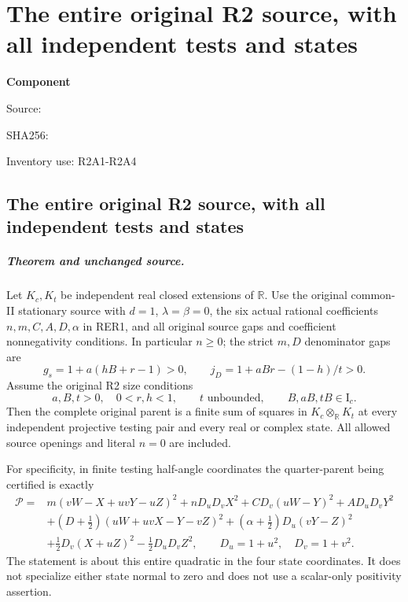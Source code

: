 \chapter{The entire original R2 source, with all independent tests and states}
\label{component:p913a09bcdcda}
\noindent\textbf{Component }\par
{\small\noindent Source: \par}
{\small\noindent SHA256: \par}
{\small\noindent Inventory use: R2A1-R2A4\par}
\medskip
\section{The entire original R2 source, with all independent tests and states}
\label{p913a09bcdcda:sec:r2-complete-rederived}

\paragraph{Theorem and unchanged source.}
Let \(K_c,K_t\) be independent real closed extensions of
\(\mathbb R\).  Use the original common-II stationary source
with \(d=1\), \(\lambda=\beta=0\), the six actual rational
coefficients \(n,m,C,A,D,\alpha\) in RER1, and all original
source gaps and coefficient nonnegativity conditions.
In particular \(n\geq0\); the strict \(m,D\) denominator
gaps are
\[
 g_s=1+a(hB+r-1)>0,\qquad
 j_D=1+aBr-(1-h)/t>0 .
\]
Assume the original R2 size conditions
\[
 a,B,t>0,\quad 0<r,h<1,\qquad
 t\text{ unbounded},\qquad B,aB,tB\in\mathrm I_c .
                                                               \tag{R2A1}
\]
Then the complete original parent is a finite sum of squares
in \(K_c\otimes_{\mathbb R}K_t\) at every independent projective
testing pair and every real or complex state.
All allowed source openings and literal \(n=0\) are included.

For specificity, in finite testing half-angle coordinates the
quarter-parent being certified is exactly
\[
\begin{split}
 \mathcal P={}&m(vW-X+uvY-uZ)^2+nD_uD_vX^2
       +CD_v(uW-Y)^2+AD_uD_vY^2\\
 &+(D+\tfrac12)(uW+uvX-Y-vZ)^2
       +(\alpha+\tfrac12)D_u(vY-Z)^2\\
 &+\tfrac12D_v(X+uZ)^2-\tfrac12D_uD_vZ^2,
 \qquad D_u=1+u^2,\quad D_v=1+v^2 .
\end{split}                                                     \tag{R2A2}
\]
The statement is about this entire quadratic in the four state
coordinates.  It does not specialize either state normal to zero
and does not use a scalar-only positivity assertion.

